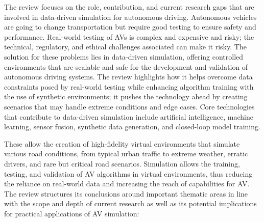 \documentclass[lettersize,journal]{IEEEtran}
\begin{document}
The review focuses on the role, contribution, and current research gaps that are involved in data-driven simulation for autonomous driving. Autonomous vehicles are going to change transportation but require good testing to ensure safety and performance. Real-world testing of AVs is complex and expensive and risky; the technical, regulatory, and ethical challenges associated can make it risky. The solution for these problems lies in data-driven simulation, offering controlled environments that are scalable and safe for the development and validation of autonomous driving systems. The review highlights how it helps overcome data constraints posed by real-world testing while enhancing algorithm training with the use of synthetic environments; it pushes the technology ahead by creating scenarios that may handle extreme conditions and edge cases. Core technologies that contribute to data-driven simulation include artificial intelligence, machine learning, sensor fusion, synthetic data generation, and closed-loop model training.

These allow the creation of high-fidelity virtual environments that simulate various road conditions, from typical urban traffic to extreme weather, erratic drivers, and rare but critical road scenarios. Simulation allows the training, testing, and validation of AV algorithms in virtual environments, thus reducing the reliance on real-world data and increasing the reach of capabilities for AV. The review structures its conclusions around important thematic areas in line with the scope and depth of current research as well as its potential implications for practical applications of AV simulation:
\end{document}
